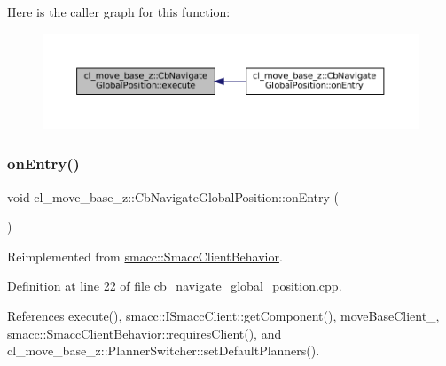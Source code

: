 Here is the caller graph for this function\+:
\nopagebreak
\begin{figure}[H]
\begin{center}
\leavevmode
\includegraphics[width=350pt]{classcl__move__base__z_1_1CbNavigateGlobalPosition_a0b8525ea9e4388b27cb1f9b1e06a3b63_icgraph}
\end{center}
\end{figure}
\mbox{\label{classcl__move__base__z_1_1CbNavigateGlobalPosition_a66d8b0555ef2945bc108dcd5171be292}} 
\subsubsection{\texorpdfstring{on\+Entry()}{onEntry()}}
{\footnotesize\ttfamily void cl\+\_\+move\+\_\+base\+\_\+z\+::\+Cb\+Navigate\+Global\+Position\+::on\+Entry (\begin{DoxyParamCaption}{ }\end{DoxyParamCaption})\hspace{0.3cm}{\ttfamily [virtual]}}



Reimplemented from \hyperlink{classsmacc_1_1SmaccClientBehavior_a7962382f93987c720ad432fef55b123f}{smacc\+::\+Smacc\+Client\+Behavior}.



Definition at line 22 of file cb\+\_\+navigate\+\_\+global\+\_\+position.\+cpp.



References execute(), smacc\+::\+I\+Smacc\+Client\+::get\+Component(), move\+Base\+Client\+\_\+, smacc\+::\+Smacc\+Client\+Behavior\+::requires\+Client(), and cl\+\_\+move\+\_\+base\+\_\+z\+::\+Planner\+Switcher\+::set\+Default\+Planners().


